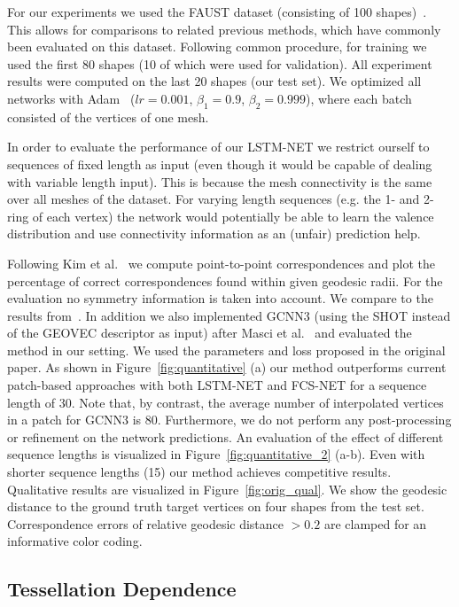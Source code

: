 \documentclass[runningheads]{llncs}
\begin{document}
For our experiments we used the FAUST dataset (consisting of 100 shapes)~\cite{Bogo:CVPR:2014}. This allows for comparisons to related previous methods, which have commonly been evaluated on this dataset. Following common procedure, for training we used the first 80 shapes (10 of which were used for validation). All experiment results were computed on the last 20 shapes (our test set). 
We optimized all networks with Adam~\cite{kingma2014adam} ($lr = 0.001$, $\beta_1 = 0.9$, $\beta_2=0.999$), where each batch consisted of the vertices of one mesh.

In order to evaluate the performance of our LSTM-NET we restrict ourself to sequences of fixed length as input (even though it would be capable of dealing with variable length input). This is because the mesh connectivity is the same over all meshes of the dataset. For varying length sequences (e.g. the 1- and 2-ring of each vertex) the network would potentially be able to learn the valence distribution and use connectivity information as an (unfair) prediction help. 

Following Kim et al.~\cite{kim2011blended} we compute point-to-point correspondences and plot the percentage of correct correspondences found within given geodesic radii. For the evaluation no symmetry information is taken into account. We compare to the results from~\cite{masci2015geodesic,boscaini2016learning,monti2017geometric}. In addition we also implemented GCNN3 (using the SHOT instead of the GEOVEC descriptor as input) after Masci et al.~\cite{masci2015geodesic} and evaluated the method in our setting. We used the parameters and loss proposed in the original paper.
As shown in Figure~\ref{fig:quantitative} (a) our method outperforms current patch-based approaches with both LSTM-NET and FCS-NET for a sequence length of 30. Note that, by contrast, the average number of interpolated vertices in a patch for GCNN3 is 80. Furthermore, we do not perform any post-processing or refinement on the network predictions. An evaluation of the effect of different sequence lengths is visualized in Figure~\ref{fig:quantitative_2} (a-b). Even with shorter sequence lengths (15) our method achieves competitive results.
Qualitative results are visualized in Figure~\ref{fig:orig_qual}. We show the geodesic distance to the ground truth target vertices on four shapes from the test set. Correspondence errors of relative geodesic distance $>0.2$ are clamped for an informative color coding.

\subsection{Tessellation Dependence}
\label{sec:rem}
\end{document}

